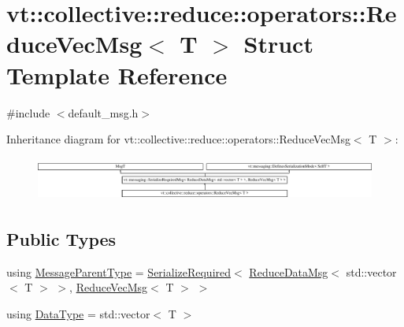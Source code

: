 \hypertarget{structvt_1_1collective_1_1reduce_1_1operators_1_1_reduce_vec_msg}{}\section{vt\+:\+:collective\+:\+:reduce\+:\+:operators\+:\+:Reduce\+Vec\+Msg$<$ T $>$ Struct Template Reference}
\label{structvt_1_1collective_1_1reduce_1_1operators_1_1_reduce_vec_msg}


{\ttfamily \#include $<$default\+\_\+msg.\+h$>$}

Inheritance diagram for vt\+:\+:collective\+:\+:reduce\+:\+:operators\+:\+:Reduce\+Vec\+Msg$<$ T $>$\+:\begin{figure}[H]
\begin{center}
\leavevmode
\includegraphics[height=1.438356cm]{structvt_1_1collective_1_1reduce_1_1operators_1_1_reduce_vec_msg}
\end{center}
\end{figure}
\subsection*{Public Types}
\begin{DoxyCompactItemize}
\item 
using \hyperlink{structvt_1_1collective_1_1reduce_1_1operators_1_1_reduce_vec_msg_a6b8e1bc57ff143c8e7e2b90b8f9059b3}{Message\+Parent\+Type} = \hyperlink{namespacevt_a9e60e2e8929828639383ac1d6643384d}{Serialize\+Required}$<$ \hyperlink{structvt_1_1collective_1_1reduce_1_1operators_1_1_reduce_data_msg}{Reduce\+Data\+Msg}$<$ std\+::vector$<$ T $>$ $>$, \hyperlink{structvt_1_1collective_1_1reduce_1_1operators_1_1_reduce_vec_msg}{Reduce\+Vec\+Msg}$<$ T $>$ $>$
\item 
using \hyperlink{structvt_1_1collective_1_1reduce_1_1operators_1_1_reduce_vec_msg_a556927389ef91ea8f5a7892501724a37}{Data\+Type} = std\+::vector$<$ T $>$
\end{DoxyCompactItemize}

